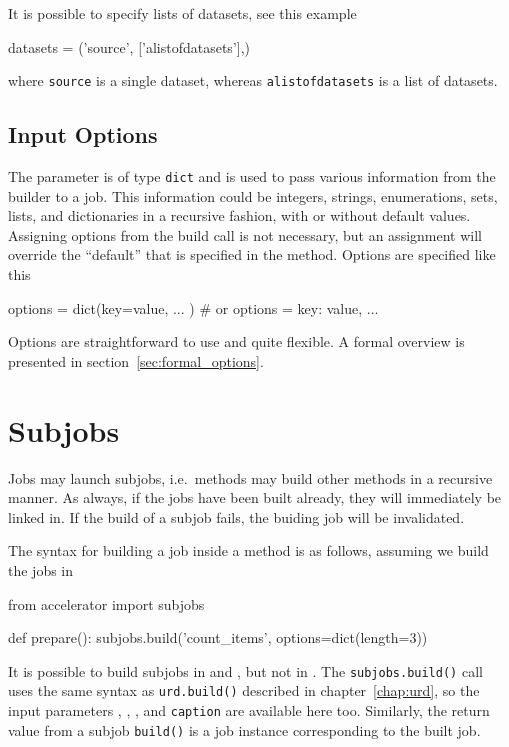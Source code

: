 It is possible to specify lists of datasets, see this example
\begin{python}
datasets = ('source', ['alistofdatasets'],)
\end{python}
where \texttt{source} is a single dataset, whereas
\texttt{alistofdatasets} is a list of datasets.



\subsection{Input Options}

The \options parameter is of type \texttt{dict} and is used to pass
various information from the builder to a job.  This information could
be integers, strings, enumerations, sets, lists, and dictionaries in a
recursive fashion, with or without default values.  Assigning options
from the build call is not necessary, but an assignment will override
the ``default'' that is specified in the method.  Options are
specified like this
\begin{python}
  options = dict(key=value, ... )  # or
  options = {key: value, ...}
\end{python}

Options are straightforward to use and quite flexible.  A formal
overview is presented in section~\ref{sec:formal_options}.



\section{Subjobs}
\label{sec:subjobs}
Jobs may launch subjobs, i.e.\ methods may build other methods in a
recursive manner.  As always, if the jobs have been built already,
they will immediately be linked in.  If the build of a subjob fails,
the buiding job will be invalidated.

The syntax for building a job inside a method is as follows, assuming
we build the jobs in \prepare
\begin{python}
from accelerator import subjobs

def prepare():
    subjobs.build('count_items', options=dict(length=3))
\end{python}
It is possible to build subjobs in \prepare and \synthesis, but not in
\analysis.  The \texttt{subjobs.build()} call uses the same syntax as
\texttt{urd.build()} described in chapter~\ref{chap:urd}, so the input
parameters \options, \datasets, \jobs, and \texttt{caption} are
available here too.  Similarly, the return value from a subjob
\texttt{build()} is a job instance corresponding to the built job.

